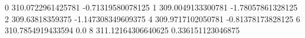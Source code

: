 0 310.0722961425781 -0.71319580078125
1 309.0049133300781 -1.78057861328125
2 309.63818359375 -1.147308349609375
4 309.9717102050781 -0.81378173828125
6 310.7854919433594 0.0
8 311.12164306640625 0.336151123046875
